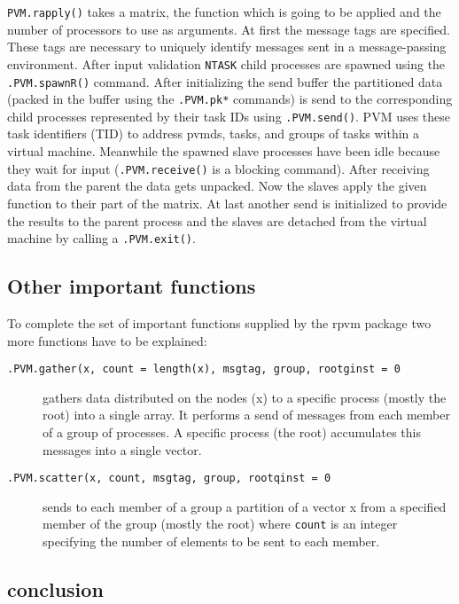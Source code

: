 \texttt{PVM.rapply()} takes a matrix, the function which is going to
be applied and the number of processors to use as arguments. At first
the message tags are specified. These tags are necessary to uniquely
identify messages sent in a message-passing environment. After
input validation \texttt{NTASK} child processes are spawned using the
\texttt{.PVM.spawnR()} command. After initializing the send buffer the
partitioned data (packed in the buffer using the \texttt{.PVM.pk*}
commands) is send to the corresponding child processes represented by
their task IDs using
\texttt{.PVM.send()}. PVM uses these task identifiers (TID) to
address pvmds, tasks, and groups of tasks within a virtual machine.
Meanwhile the spawned slave processes have been idle because they wait
for input (\texttt{.PVM.receive()} is a blocking command). After
receiving data from the parent the data gets unpacked. Now the slaves
apply the given function to their part of the matrix. At last another
send is initialized to provide the results to the parent process and
the slaves are detached from the virtual machine by calling a
\texttt{.PVM.exit()}. 

\subsection{Other important functions}

To complete the set of important functions supplied by the rpvm
package two more functions have to be explained:

\begin{description}
\item[\texttt{.PVM.gather(x, count = length(x), msgtag, group,
    rootginst = 0}] gathers data distributed on the nodes (x) to a
  specific process (mostly the root) into a single array. It performs
  a send of messages from each member of a group of processes. A
  specific process (the root) accumulates this messages into a single vector.
\item[\texttt{.PVM.scatter(x, count, msgtag, group, rootqinst = 0}]
  sends to each member of a group a partition of  a vector x from a
  specified member of the group (mostly the root) where \texttt{count}
  is an integer specifying the number of elements to be sent to each
  member. 
\end{description}

\subsection{conclusion}

